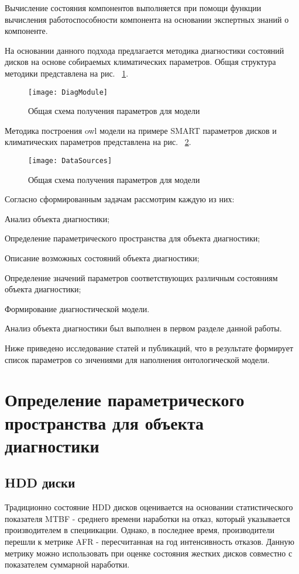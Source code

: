 Вычисление  состояния  компонентов  выполняется  при  помощи функции вычисления работоспособности компонента на основании экспертных знаний о компоненте.

На основании данного подхода предлагается методика диагностики состояний дисков на основе собираемых климатических параметров. Общая структура методики представлена на рис. ~\ref{fig:DiagModule}.
\begin{figure}[h]
	\centering
	\texttt{[image: DiagModule]}
	\caption{Общая схема получения параметров для модели}
	\label{fig:DiagModule}
\end{figure}

Методика построения owl модели на примере SMART параметров дисков и климатических параметров представлена на рис. ~\ref{fig:DataSources}.

\begin{figure}[h]
	\centering
	\texttt{[image: DataSources]}
	\caption{Общая схема получения параметров для модели}
	\label{fig:DataSources}
\end{figure}

Согласно сформированным задачам рассмотрим каждую из них: 
\begin{itemize*}
	\item{Анализ объекта диагностики;}
	\item{Определение параметрического пространства для объекта диагностики;}
	\item{Описание возможных состояний объекта диагностики;}
	\item{Определение значений параметров соответствующих различным состояниям объекта диагностики;}
	\item{Формирование диагностической модели.}
\end{itemize*}

Анализ объекта диагностики был выполнен в первом разделе данной работы. 

Ниже приведено исследование статей и публикаций, что в результате формирует список параметров со знчениями для наполнения онтологической модели.

\section{Определение параметрического пространства для объекта диагностики}

\subsection{HDD диски}
Традиционно состояние HDD дисков оценивается на основании статистического показателя MTBF - среднего времени наработки на отказ, который указывается производителем в специикации. Однако, в последнее время, производители перешли к метрике AFR - пересчитанная на год интенсивность отказов. Данную метрику можно использовать при оценке состояния жестких дисков совместно с показателем суммарной наработки.  

